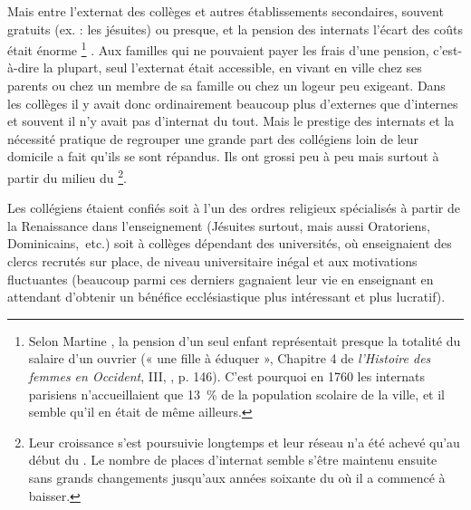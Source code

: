Mais entre l'externat des collèges et autres établissements secondaires, souvent gratuits (ex. : les jésuites) ou presque, et la pension des internats l'écart des coûts était énorme%
\footnote{Selon Martine , la pension d'un seul enfant représentait presque la totalité du salaire d'un ouvrier (« une fille à éduquer », Chapitre 4 de \emph{l'Histoire des femmes en Occident}, III, , p. 146). C'est pourquoi en 1760 les internats parisiens n'accueillaient que 13~\% de la population scolaire de la ville, et il semble qu'il en était de même ailleurs.}%
. Aux familles qui ne pouvaient payer les frais d'une pension, c'est-à-dire la plupart, seul l'externat était accessible, en vivant en ville chez ses parents ou chez un membre de sa famille ou chez un logeur peu exigeant. Dans les collèges il y avait donc ordinairement beaucoup plus d'externes que d'internes et souvent il n'y avait pas d'internat du tout. Mais le prestige des internats et la nécessité pratique de regrouper une grande part des collégiens loin de leur domicile a fait qu'ils se sont répandus. Ils ont grossi peu à peu mais surtout à partir du milieu du \footnote{Leur croissance s'est poursuivie longtemps et leur réseau n'a été achevé qu'au début du . Le nombre de places d'internat semble s'être maintenu ensuite sans grands changements jusqu'aux années soixante du  où il a commencé à baisser.}. 

 
 

Les collégiens étaient confiés soit à l'un des ordres religieux spécialisés à partir de la Renaissance dans l'enseignement (Jésuites surtout, mais aussi Oratoriens, Dominicains,~etc.) soit à collèges dépendant des universités, où enseignaient des clercs recrutés sur place, de niveau universitaire inégal et aux motivations fluctuantes (beaucoup parmi ces derniers gagnaient leur vie en enseignant en attendant d'obtenir un bénéfice ecclésiastique plus intéressant et plus lucratif). 

